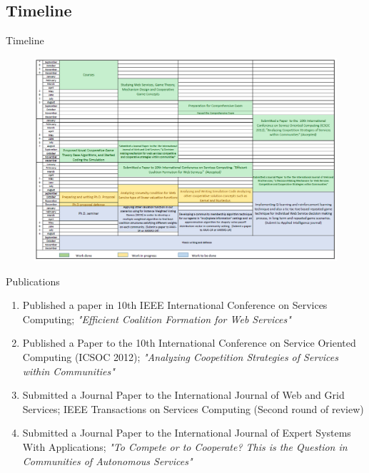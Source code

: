 \documentclass{beamer}
\begin{document}
\subsection{Timeline}
    \begin{frame}{Timeline}


\begin{figure}[htbp]
\begin{center}
\includegraphics[width=1 \columnwidth]{figures/timetable.png}
\end{center}
\end{figure}
    \end{frame}
\begin{frame}{Publications}

    \begin{enumerate}
        \item Published a paper in 10th IEEE International Conference on Services Computing; \emph{"Efficient Coalition Formation for Web Services"}
        \item Published a Paper to the 10th International Conference on Service Oriented Computing (ICSOC 2012); \emph{"Analyzing Coopetition Strategies of Services within Communities"}
        \item Submitted a Journal Paper to the International Journal of Web and Grid Services; IEEE Transactions on Services Computing {\color{blue} (Second round of review)}
        \item Submitted a Journal Paper to the International Journal of Expert Systems With Applications; \emph{"To Compete or to Cooperate? This is the Question in Communities of Autonomous Services"}
    \end{enumerate}


\end{frame}
\end{document}
